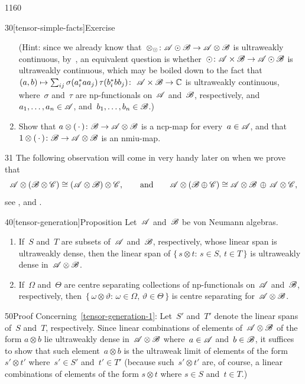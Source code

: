\begin{parsec}{1160}
\begin{point}{30}[tensor-simple-facts]{Exercise}
\begin{enumerate}
(Hint: since we
already know that~$\otimes_\odot\colon \scrA\odot\scrB\to\scrA\otimes\scrB$
is ultraweakly continuous, by~,
an equivalent question 
is whether~$\odot\colon \scrA\times\scrB\to\scrA\odot\scrB$
is ultraweakly continuous,
which may be boiled down
to the fact
that $(a,b)\mapsto \sum_{ij} \sigma(a_i^* a a_j)\,\tau(b_i^* b b_j)\colon
\ \scrA\times \scrB\to\C$ is ultraweakly continuous,
where~$\sigma$ and~$\tau$ are np-functionals
on~$\scrA$ and~$\scrB$, respectively,
and
$a_1,\dotsc,a_n\in\scrA$, and~$b_1,\dotsc,b_n\in\scrB$.)
\item
Show that $a\otimes(\,\cdot\,)\colon \mathscr{B}\to \mathscr{A} \otimes \mathscr{B}$
is a ncp-map for every~$a\in\mathscr{A}$,
and that $1\otimes(\,\cdot\,)\colon \mathscr{B}\to \mathscr{A}\otimes \mathscr{B}$
is an nmiu-map.
\end{enumerate}
\spacingfix%
\end{point}%
\begin{point}{31}%
The following observation will come in very handy later on when we prove that
\begin{equation*}
\mathscr{A}\otimes (\mathscr{B}\otimes \mathscr{C})
    \cong (\mathscr{A}\otimes\mathscr{B})\otimes \mathscr{C},
    \qquad\text{and}\qquad
\mathscr{A}\otimes (\mathscr{B}\oplus\mathscr{C})\cong\mathscr{A}\otimes \mathscr{B}
    \,\oplus\,\mathscr{A}\otimes \mathscr{C},
\end{equation*}
see , and .
\end{point}
\begin{point}{40}[tensor-generation]{Proposition}
Let~$\scrA$ and~$\scrB$ 
be von Neumann algebras.
\begin{enumerate}
\item
\label{tensor-generation-1}
If~$S$ and~$T$ are subsets of~$\scrA$
and~$\scrB$, respectively,
whose linear span is ultraweakly dense,
then the linear span
of $\{\,s\otimes t\colon\,s\in S,\,t\in T\,\}$
is ultraweakly dense in~$\mathscr{A}\otimes\mathscr{B}$.
\item
\label{tensor-generation-2}
If~$\Omega$ and~$\Theta$ are centre separating collections
of np-functionals on~$\scrA$ and~$\scrB$, respectively,
then~$\{\,\omega\otimes\vartheta\colon\, 
\omega\in\Omega,\,\vartheta\in\Theta\,\}$
is centre separating for~$\mathscr{A}\otimes\mathscr{B}$.
\end{enumerate}%
\spacingfix%
\begin{point}{50}{Proof}%
Concerning~\ref{tensor-generation-1}:
Let~$S'$ and~$T'$ denote the linear spans of~$S$
and~$T$, respectively.
Since linear combinations of elements of~$\mathscr{A}\otimes\mathscr{B}$
of the form $a\otimes b$
lie ultraweakly dense in~$\mathscr{A}\otimes\mathscr{B}$ 
where~$a\in\mathscr{A}$ and~$b\in\mathscr{B}$,
it suffices to show that such element~$a\otimes b$
is the ultraweak limit of elements of the form $s'\otimes t'$
where~$s'\in S'$ and~$t'\in T'$
(because such~$s'\otimes t'$ are, of course, a linear combinations
of elements of the form $s\otimes t$ where $s\in S$
    and~$t\in T$.)


\end{point}
\end{point}
\end{parsec}

